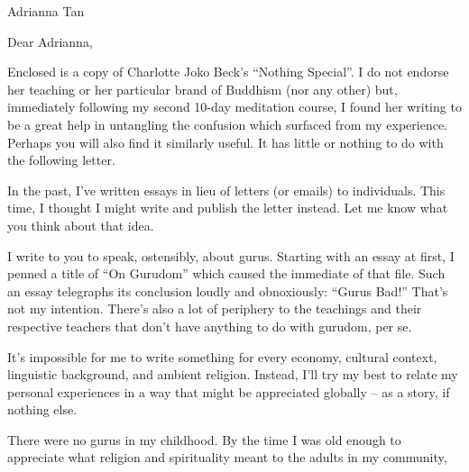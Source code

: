 \documentclass{letter}
\newcommand\hr{\par\vspace{-.5\ht\strutbox}\noindent\hrulefill\par}
\begin{document}
\begin{letter}{Adrianna Tan}
\opening{Dear Adrianna,}

Enclosed is a copy of Charlotte Joko Beck's ``Nothing Special''.
I do not endorse her teaching or her particular brand of Buddhism (nor any other) but, immediately following my second 10-day meditation course, I found her writing to be a great help in untangling the confusion which surfaced from my experience.
Perhaps you will also find it similarly useful.
It has little or nothing to do with the following letter.

In the past, I've written essays in lieu of letters (or emails) to individuals.
This time, I thought I might write and publish the letter instead.
Let me know what you think about that idea.

I write to you to speak, ostensibly, about gurus.
Starting with an essay at first, I penned a title of ``On Gurudom'' which caused the immediate  of that file.
Such an essay telegraphs its conclusion loudly and obnoxiously: ``Gurus Bad!''
That's not my intention.
There's also a lot of periphery to the teachings and their respective teachers that don't have anything to do with gurudom, per se.

It's impossible for me to write something for every economy, cultural context, linguistic background, and ambient religion.
Instead, I'll try my best to relate my personal experiences in a way that might be appreciated globally -- as a story, if nothing else.

\hr

There were no gurus in my childhood.
By the time I was old enough to appreciate what religion and spirituality meant to the adults in my community,

\end{letter}
\end{document}

